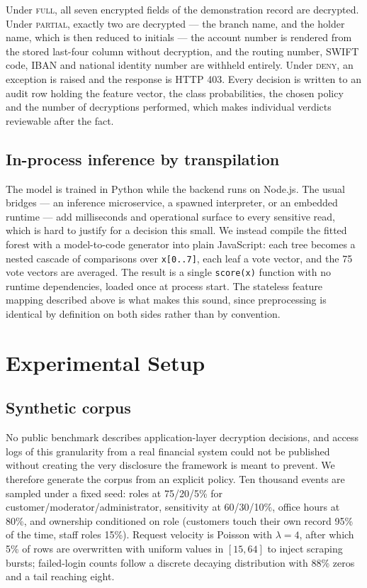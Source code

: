 \documentclass[a4paper,conference]{IEEEtran}
\begin{document}
Under \textsc{full}, all seven encrypted fields of the demonstration record are decrypted. Under
\textsc{partial}, exactly two are decrypted --- the branch name, and the holder name, which is
then reduced to initials --- the account number is rendered from the stored last-four column
without decryption, and the routing number, SWIFT code, IBAN and national identity number are
withheld entirely. Under \textsc{deny}, an exception is raised and the response is HTTP 403.
Every decision is written to an audit row holding the feature vector, the class probabilities,
the chosen policy and the number of decryptions performed, which makes individual verdicts
reviewable after the fact.

\subsection{In-process inference by transpilation}

The model is trained in Python while the backend runs on Node.js. The usual bridges --- an
inference microservice, a spawned interpreter, or an embedded runtime --- add milliseconds and
operational surface to every sensitive read, which is hard to justify for a decision this small.
We instead compile the fitted forest with a model-to-code generator into plain JavaScript: each
tree becomes a nested cascade of comparisons over \texttt{x[0..7]}, each leaf a vote vector, and
the 75 vote vectors are averaged. The result is a single \texttt{score(x)} function with no
runtime dependencies, loaded once at process start. The stateless feature mapping described
above is what makes this sound, since preprocessing is identical by definition on both sides
rather than by convention.

\section{Experimental Setup}

\subsection{Synthetic corpus}

No public benchmark describes application-layer decryption decisions, and access logs of this
granularity from a real financial system could not be published without creating the very
disclosure the framework is meant to prevent. We therefore generate the corpus from an explicit
policy. Ten thousand events are sampled under a fixed seed: roles at 75/20/5\% for
customer/moderator/administrator, sensitivity at 60/30/10\%, office hours at 80\%, and ownership
conditioned on role (customers touch their own record 95\% of the time, staff roles 15\%).
Request velocity is Poisson with $\lambda=4$, after which 5\% of rows are overwritten with
uniform values in $[15,64]$ to inject scraping bursts; failed-login counts follow a discrete
decaying distribution with 88\% zeros and a tail reaching eight.
\end{document}
